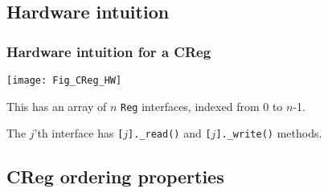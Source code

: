 
\subsection{Hardware intuition}

\begin{frame}[fragile]
\frametitle{Hardware intuition for a CReg}

\label{slide_hw_intuition}

\footnotesize

\begin{center}
 \texttt{[image: Fig\_CReg\_HW]}

 \vspace{1ex}

 This has an array of $n$ {\tt Reg} interfaces, indexed from 0 to $n$-1.

 \vspace{1ex}

 The $j$'th interface has {\tt [$j$].\_read()} and {\tt [$j$].\_write()} methods.
\end{center}

\end{frame}


\subsection{CReg ordering properties}

